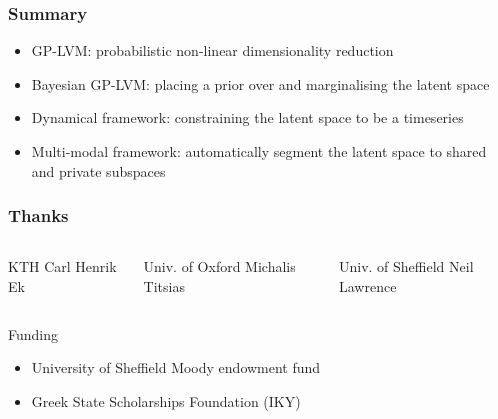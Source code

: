 \documentclass{beamer}
\begin{document}
\begin{frame}
	\frametitle{Summary}
	\begin{itemize}
		             \item \alert{GP-LVM}: probabilistic non-linear dimensionality reduction
		\vspace{6pt} \item \alert{Bayesian GP-LVM}: placing a prior over and marginalising the latent space
		\vspace{6pt} \item \alert{Dynamical framework}: constraining the latent space to be a timeseries
		\vspace{6pt} \item \alert{Multi-modal framework}: automatically segment the latent space to shared and private subspaces
	\end{itemize}
\end{frame}

\begin{frame}
 \frametitle{Thanks}
   \begin{columns}
    \begin{block}{KTH}
      Carl Henrik Ek
    \end{block}

    \begin{block}{Univ. of Oxford}
      Michalis Titsias
    \end{block}
    
    \begin{block}{Univ. of Sheffield}
      Neil Lawrence
    \end{block}
  \end{columns}
  \vspace{1cm}
  \begin{block}{Funding}
    \begin{itemize}
    \item University of Sheffield Moody endowment fund
    \item Greek State Scholarships Foundation (IKY)
    \end{itemize}
  \end{block}

\end{frame}
\end{document}
